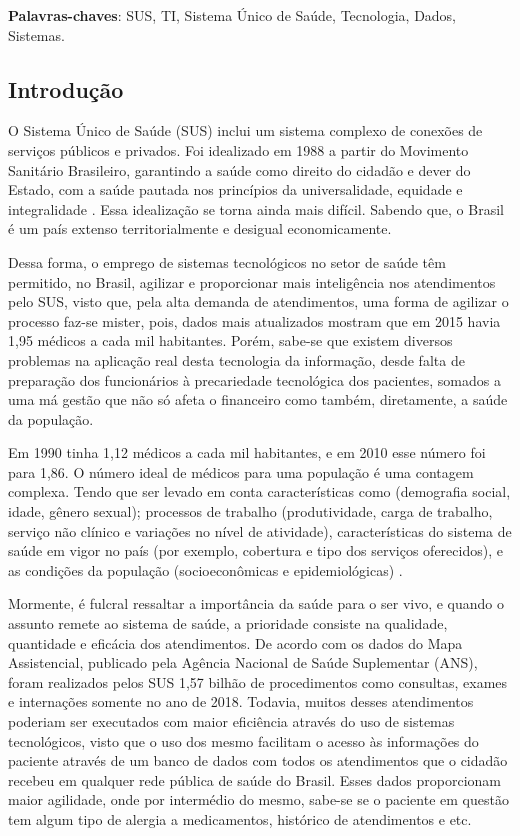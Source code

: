 \documentclass[twoside]{article}
\begin{document}
\textbf{Palavras-chaves}: SUS, TI, Sistema Único de Saúde, Tecnologia, Dados, Sistemas.
%
\vspace{0.5cm}
\begin{multicols}{2}

  \section{Introdução}

O Sistema Único de Saúde (SUS) inclui um sistema complexo de conexões de serviços públicos e privados. Foi idealizado em 1988 a partir do Movimento Sanitário Brasileiro, garantindo a saúde como direito do cidadão e dever do Estado, com a saúde pautada nos princípios da universalidade, equidade e integralidade \cite{Miranda_2017}.
Essa idealização se torna ainda mais difícil. Sabendo que, o Brasil é um país extenso territorialmente e desigual economicamente.

Dessa forma, o emprego de sistemas tecnológicos no setor de saúde têm permitido, no Brasil, agilizar e proporcionar mais inteligência nos atendimentos pelo SUS, visto que, pela alta demanda de atendimentos, uma forma de agilizar o processo faz-se mister, pois, dados mais atualizados mostram que em 2015 havia 1,95 médicos a cada mil habitantes. Porém, sabe-se que existem diversos problemas na aplicação real desta tecnologia da informação, desde falta de preparação dos funcionários à precariedade tecnológica dos pacientes, somados a uma má gestão que não só afeta o financeiro como também, diretamente, a saúde da população.

Em 1990 tinha 1,12 médicos a cada mil habitantes, e em 2010 esse número foi para 1,86. O número ideal de médicos para uma população é uma contagem complexa. Tendo que ser levado em conta características como (demografia social, idade, gênero sexual); processos de trabalho (produtividade, carga de trabalho, serviço não clínico e variações no nível de atividade), características do sistema de saúde em vigor no país (por exemplo, cobertura e tipo
dos serviços oferecidos), e as condições da população (socioeconômicas e epidemiológicas) \cite{Oliveira_2017}.

Mormente, é fulcral ressaltar a importância da saúde para o ser vivo, e quando o assunto remete ao sistema de saúde, a prioridade consiste na qualidade, quantidade e eficácia dos atendimentos. De acordo com os dados do Mapa Assistencial, publicado pela Agência Nacional de Saúde Suplementar (ANS), foram realizados pelos SUS 1,57 bilhão de procedimentos como consultas, exames e internações somente no ano de 2018. Todavia, muitos desses atendimentos poderiam ser executados com maior eficiência através do uso de sistemas tecnológicos, visto que o uso dos mesmo facilitam o acesso às informações do paciente através de um banco de dados com todos os atendimentos que o cidadão recebeu em qualquer rede pública de saúde do Brasil. Esses dados proporcionam maior agilidade, onde por intermédio do mesmo, sabe-se se o paciente em questão tem algum tipo de alergia a medicamentos, histórico de atendimentos e etc.


\end{multicols}
\end{document}
